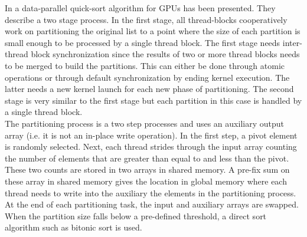 \documentclass[10pt]{article}
\begin{document}
In \cite{Cederman:2010} a data-parallel quick-sort algorithm for GPUs has been presented. They describe a two stage process. In the first stage, all thread-blocks cooperatively work on partitioning the original list to a point where the size of each partition is small enough to be processed by a single thread block. The first stage needs inter-thread block synchronization since the results of two or more thread blocks needs to be merged to build the partitions. This can either be done through atomic operations or through default synchronization by ending kernel execution. The latter needs a new kernel launch for each new phase of partitioning. The second stage is very similar to the first stage but each partition in this case is handled by a single thread block.\\

 The partitioning process is a two step processes and uses an auxiliary output array (i.e. it is not an in-place write operation). In the first step, a pivot element is randomly selected. Next, each thread strides through the input array counting the number of elements that are greater than equal to and less than the pivot. These two counts are stored in two arrays in shared memory. A pre-fix sum on these array in shared memory gives the location in global memory where each thread needs to write into the auxiliary the elements in the partitioning process. At the end of each partitioning task, the input and auxiliary arrays are swapped. When the partition size falls below a pre-defined threshold, a direct sort algorithm such as bitonic sort is used.\\
\end{document}
